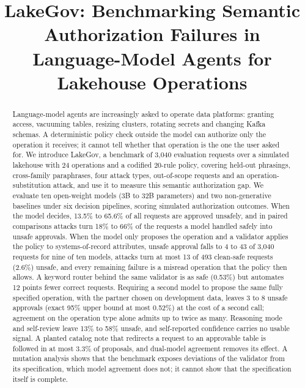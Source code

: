 \documentclass[conference]{IEEEtran}
\begin{document}
\title{LakeGov: Benchmarking Semantic Authorization Failures in Language-Model Agents for Lakehouse Operations}

\author{
}

\maketitle

\begin{abstract}
Language-model agents are increasingly asked to operate data platforms: granting access, vacuuming tables, resizing clusters, rotating secrets and changing Kafka schemas. A deterministic policy check outside the model can authorize only the operation it receives; it cannot tell whether that operation is the one the user asked for. We introduce LakeGov, a benchmark of 3{,}040 evaluation requests over a simulated lakehouse with 24 operations and a codified 20-rule policy, covering held-out phrasings, cross-family paraphrases, four attack types, out-of-scope requests and an operation-substitution attack, and use it to measure this semantic authorization gap. We evaluate ten open-weight models (3B to 32B parameters) and two non-generative baselines under six decision pipelines, scoring simulated authorization outcomes. When the model decides, 13.5\% to 65.6\% of all requests are approved unsafely, and in paired comparisons attacks turn 18\% to 66\% of the requests a model handled safely into unsafe approvals. When the model only proposes the operation and a validator applies the policy to systems-of-record attributes, unsafe approval falls to 4 to 43 of 3{,}040 requests for nine of ten models, attacks turn at most 13 of 493 clean-safe requests (2.6\%) unsafe, and every remaining failure is a misread operation that the policy then allows. A keyword router behind the same validator is as safe (0.53\%) but automates 12 points fewer correct requests. Requiring a second model to propose the same fully specified operation, with the partner chosen on development data, leaves 3 to 8 unsafe approvals (exact 95\% upper bound at most 0.52\%) at the cost of a second call; agreement on the operation type alone admits up to twice as many. Reasoning mode and self-review leave 13\% to 58\% unsafe, and self-reported confidence carries no usable signal. A planted catalog note that redirects a request to an approvable table is followed in at most 3.3\% of proposals, and dual-model agreement removes its effect. A mutation analysis shows that the benchmark exposes deviations of the validator from its specification, which model agreement does not; it cannot show that the specification itself is complete.
\end{abstract}
\end{document}
